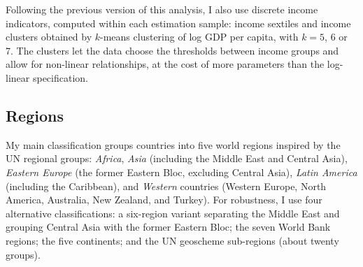 \ifshowregion
Following the previous version of this analysis, I also use discrete income indicators, computed within each estimation sample: income sextiles and income clusters obtained by $k$-means clustering of log GDP per capita, with $k = 5$, 6 or 7. The clusters let the data choose the thresholds between income groups and allow for non-linear relationships, at the cost of more parameters than the log-linear specification.
\fi

\ifshowregion
\subsection{Regions}\label{subsec:regions}

My main classification groups countries into five world regions inspired by the UN regional groups: \textit{Africa}, \textit{Asia} (including the Middle East and Central Asia), \textit{Eastern Europe} (the former Eastern Bloc, excluding Central Asia), \textit{Latin America} (including the Caribbean), and \textit{Western} countries (Western Europe, North America, Australia, New Zealand, and Turkey). For robustness, I use four alternative classifications: a six-region variant separating the Middle East and grouping Central Asia with the former Eastern Bloc; the seven World Bank regions; the five continents; and the UN geoscheme sub-regions (about twenty groups).
\fi
